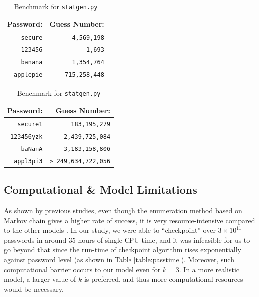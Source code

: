 \documentclass{article} %
\theoremstyle{definition}
\theoremstyle{theorem}
\theoremstyle{remark}
\theoremstyle{remark}
\begin{document}
    \begin{table}[!htbp]
        \begin{minipage}{.5\linewidth}
            \centering
            \begin{tabular}{|r|r|}
                \hline
                Password:               & Guess Number:                      \\ \hline
                \texttt{secure}         & \texttt{4,569,198}         \\ \hline
                \texttt{123456}         & \texttt{1,693}         \\ \hline
                \texttt{banana}         & \texttt{1,354,764}        \\ \hline
                \texttt{applepie}       & \texttt{715,258,448}         \\ \hline
            \end{tabular}
            
            \caption{Benchmark for \texttt{statgen.py}}
            \label{table:calcresult1}
        \end{minipage}
        \begin{minipage}{.5\linewidth}
            \centering
            \begin{tabular}{|r|r|}
                \hline
                Password:               & Guess Number:                      \\ \hline
                \texttt{secure1}        & \texttt{183,195,279}         \\ \hline
                \texttt{123456yzk}      & \texttt{2,439,725,084}         \\ \hline
                \texttt{baNanA}         & \texttt{3,183,158,806}        \\ \hline
                \texttt{appl3pi3}       & \texttt{> 249,634,722,056}         \\ \hline
            \end{tabular}
            
            \caption{Benchmark for \texttt{statgen.py}}
            \label{table:calcresult2}
        \end{minipage}
    \end{table}
   
\subsection{Computational \& Model Limitations}   \label{sect:limitation}
\par\quad As shown by previous studies, even though the enumeration method based on Markov chain gives a higher rate of success, it is very resource-intensive compared to the other models \cite{guessability}. In our study, we were able to ``checkpoint'' over $3\times 10^{11}$ passwords in around $35$ hours of single-CPU time, and it was infeasible for us to go beyond that since the run-time of checkpoint algorithm rises exponentially against password level (as shown in Table \ref{table:passtime}). Moreover, such computational barrier occurs to our model even for $k=3$. In a more realistic model, a larger value of $k$ is preferred, and thus more computational resources would be necessary.
\end{document}
